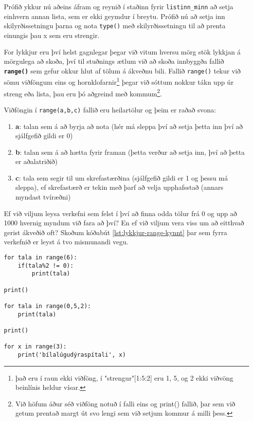 Prófið ykkur nú aðeins áfram og reynið í staðinn fyrir \texttt{listinn\_minn} að setja einhvern annan lista, sem er ekki geymdur í breytu.
Prófið nú að setja inn skilyrðissetningu þarna og nota \texttt{type()} með skilyrðissetningu til að prenta einungis þau x sem eru strengir.

For lykkjur eru því helst gagnlegar þegar við vitum hversu mörg stök lykkjan á mörgulega að skoða, því til stuðnings ætlum við að skoða innbyggða fallið \textbf{\texttt{range()}} sem gefur okkur hlut af tölum á ákveðnu bili.
Fallið \texttt{range()} tekur við sömu viðföngum eins og hornklofarnir\footnote{það eru í raun ekki viðföng, í "strengur"[1:5:2] eru 1, 5, og 2 ekki viðvöng beinlínis heldur vísar.} þegar við sóttum nokkur tákn upp úr streng eða lista, þau eru þó aðgreind með kommum\footnote{Við höfum áður séð viðföng notuð í falli eins og print() fallið, þar sem við getum prentað margt út svo lengi sem við setjum kommur á milli þess.}.

Viðföngin í \texttt{range(a,b,c)} fallið eru heilartölur og þeim er raðað svona:

\begin{enumerate}
	\item \textbf{a}: talan sem á að byrja að nota (hér má sleppa því að setja þetta inn því að sjálfgefið gildi er 0)
	\item \textbf{b}: talan sem á að hætta fyrir framan (þetta verður að setja inn, því að þetta er aðalatriðið)
	\item \textbf{c}: tala sem segir til um skrefastærðina (sjálfgefið gildi er 1 og þessu má sleppa), ef skrefastærð er tekin með þarf að velja upphafsstað (annars myndast tvíræðni)
\end{enumerate}

Ef við viljum leysa verkefni sem felst í því að finna odda tölur frá 0 og upp að 1000 hvernig myndum við fara að því?
En ef við viljum vera viss um að eitthvað gerist ákveðið oft?
Skoðum kóðabút \ref{lst:lykkjur-range-kynnt} þar sem fyrra verkefnið er leyst á tvo mismunandi vegu.

\begin{lstlisting}[caption=range() fallið kynnt með for lykkju, label=lst:lykkjur-range-kynnt]
for tala in range(6):
	if(tala%2 != 0):
		print(tala)		

print()

for tala in range(0,5,2):
	print(tala)

print()

for x in range(3):
	print('bílalúgudýraspítali', x)
\end{lstlisting}		
		
